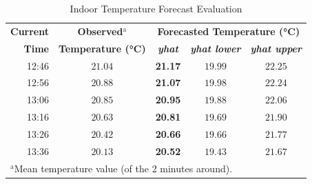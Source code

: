 \documentclass[conference]{IEEEtran}
\begin{document}
\begin{table}[htbp]
    \caption{Indoor Temperature Forecast Evaluation}
    \begin{center}
        \begin{tabular}{|r|c|c|c|c|}
            \hline
            \textbf{Current} & \textbf{Observed}$^{\mathrm{a}}$ & \multicolumn{3}{|c|}{\textbf{Forecasted Temperature (°C)}} \\
            \cline{3-5}
            \textbf{Time} & \textbf{Temperature (°C)} & \textbf{\textit{yhat}} & \textbf{\textit{yhat lower}} & \textbf{\textit{yhat upper}} \\
            \hline
            12:46 & $21.04$ & \textbf{21.17} & $19.99$ & $22.25$ \\
            \hline
            12:56 & $20.88$ & \textbf{21.07} & $19.98$ & $22.24$ \\
            \hline
            13:06 & $20.85$ & \textbf{20.95} & $19.88$ & $22.06$ \\
            \hline
            13:16 & $20.63$ & \textbf{20.81} & $19.69$ & $21.90$ \\
            \hline
            13:26 & $20.42$ & \textbf{20.66} & $19.66$ & $21.77$ \\
            \hline
            13:36 & $20.13$ & \textbf{20.52} & $19.43$ & $21.67$ \\
            \hline
            \multicolumn{4}{l}{$^{\mathrm{a}}$Mean temperature value (of the 2 minutes around).}
        \end{tabular}
        \label{tab_forecast_indoor}
    \end{center}
\end{table}
\end{document}
